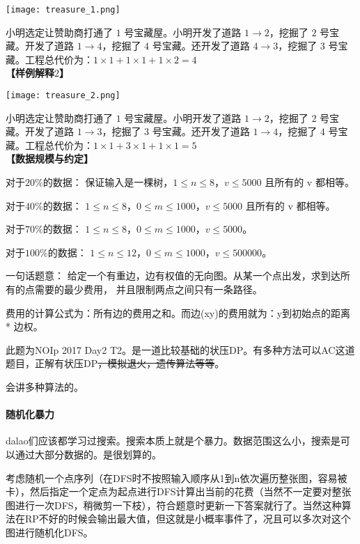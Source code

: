 \begin{example}
	\begin{center}\texttt{[image: treasure\_1.png]}\end{center}
	小明选定让赞助商打通了 $1$ 号宝藏屋。小明开发了道路 $1 \to 2$，挖掘了 $2$ 号宝藏。开发了道路 $1 \to 4$，挖掘了 $4$ 号宝藏。还开发了道路 $4 \to 3$，挖掘了 $3$ 号宝藏。工程总代价为：$1 \times 1 + 1 \times 1 + 1 \times 2 = 4$
	\ \\
	\textbf{【样例解释$2$】}

	\begin{center}\texttt{[image: treasure\_2.png]}\end{center}

	小明选定让赞助商打通了 $1$ 号宝藏屋。小明开发了道路 $1 \to 2$，挖掘了 $2$ 号宝藏。开发了道路 $1 \to 3$，挖掘了 $3$ 号宝藏。还开发了道路 $1 \to 4$，挖掘了 $4$ 号宝藏。工程总代价为：$1 \times 1 + 3 \times 1 + 1 \times 1 = 5$
	\ \\
	\textbf{【数据规模与约定】}

	对于$20\%$的数据： 保证输入是一棵树，$1 \le n \le 8$，$v \le 5000$ 且所有的 v 都相等。

	对于$40\%$的数据： $1 \le n \le 8$，$0 \le m \le 1000$，$v \le 5000$ 且所有的 v 都相等。

	对于$70\%$的数据： $1 \le n \le 8$，$0 \le m \le 1000$，$v \le 5000$。

	对于$100\%$的数据： $1 \le n \le 12$，$0 \le m \le 1000$，$v \le 500000$。
\end{example}

一句话题意：
给定一个有重边，边有权值的无向图。从某一个点出发，求到达所有的点需要的最少费用，
并且限制两点之间只有一条路径。

费用的计算公式为：所有边的费用之和。而边(x\to y)的费用就为：y到初始点的距离 * 边权。

此题为NOIp 2017 Day2 T2。是一道比较基础的状压DP。有多种方法可以AC这道题目，正解有状压DP\sout{，模拟退火，遗传算法等等}。

会讲多种算法的。
\paragraph{随机化暴力}
dalao们应该都学习过搜索。搜索本质上就是个暴力。数据范围这么小，搜索是可以通过大部分数据的。是很划算的。

考虑随机一个点序列（在DFS时不按照输入顺序从1到n依次遍历整张图，容易被卡），然后指定一个定点为起点进行DFS计算出当前的花费（当然不一定要对整张图进行一次DFS，稍微剪一下枝），符合题意时更新一下答案就行了。当然这种算法在RP不好的时候会输出最大值，但这就是小概率事件了，况且可以多次对这个图进行随机化DFS。

